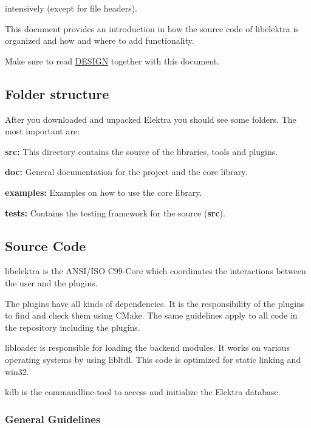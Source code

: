 intensively (except for file headers).

This document provides an introduction in how the source code of libelektra is organized and how and where to add functionality.

Make sure to read \hyperlink{doc_DESIGN_md}{D\+E\+S\+I\+G\+N} together with this document.

\subsection*{Folder structure}

After you downloaded and unpacked Elektra you should see some folders. The most important are\+:


\begin{DoxyItemize}
\item {\bfseries src\+:} This directory contains the source of the libraries, tools and plugins.
\item {\bfseries doc\+:} General documentation for the project and the core library.
\item {\bfseries examples\+:} Examples on how to use the core library.
\item {\bfseries tests\+:} Contains the testing framework for the source ({\bfseries src}).
\end{DoxyItemize}

\subsection*{Source Code}

libelektra is the A\+N\+S\+I/\+I\+S\+O C99-\/\+Core which coordinates the interactions between the user and the plugins.

The plugins have all kinds of dependencies. It is the responsibility of the plugins to find and check them using C\+Make. The same guidelines apply to all code in the repository including the plugins.

{\ttfamily libloader} is responsible for loading the backend modules. It works on various operating systems by using {\ttfamily libltdl}. This code is optimized for static linking and win32.

kdb is the commandline-\/tool to access and initialize the Elektra database.

\subsubsection*{General Guidelines}

